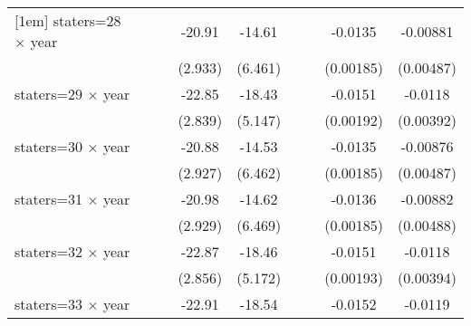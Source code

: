 {\begin{longtable}{l*{8}{c}}
[1em]
staters=28 $\times$ year&                     &                     &      -20.91\sym{***}&      -14.61\sym{**} &                     &                     &     -0.0135\sym{***}&    -0.00881\sym{*}  \\
                    &                     &                     &     (2.933)         &     (6.461)         &                     &                     &   (0.00185)         &   (0.00487)         \\
[1em]
staters=29 $\times$ year&                     &                     &      -22.85\sym{***}&      -18.43\sym{***}&                     &                     &     -0.0151\sym{***}&     -0.0118\sym{***}\\
                    &                     &                     &     (2.839)         &     (5.147)         &                     &                     &   (0.00192)         &   (0.00392)         \\
[1em]
staters=30 $\times$ year&                     &                     &      -20.88\sym{***}&      -14.53\sym{**} &                     &                     &     -0.0135\sym{***}&    -0.00876\sym{*}  \\
                    &                     &                     &     (2.927)         &     (6.462)         &                     &                     &   (0.00185)         &   (0.00487)         \\
[1em]
staters=31 $\times$ year&                     &                     &      -20.98\sym{***}&      -14.62\sym{**} &                     &                     &     -0.0136\sym{***}&    -0.00882\sym{*}  \\
                    &                     &                     &     (2.929)         &     (6.469)         &                     &                     &   (0.00185)         &   (0.00488)         \\
[1em]
staters=32 $\times$ year&                     &                     &      -22.87\sym{***}&      -18.46\sym{***}&                     &                     &     -0.0151\sym{***}&     -0.0118\sym{***}\\
                    &                     &                     &     (2.856)         &     (5.172)         &                     &                     &   (0.00193)         &   (0.00394)         \\
[1em]
staters=33 $\times$ year&                     &                     &      -22.91\sym{***}&      -18.54\sym{***}&                     &                     &     -0.0152\sym{***}&     -0.0119\sym{***}\\

\end{longtable}}
